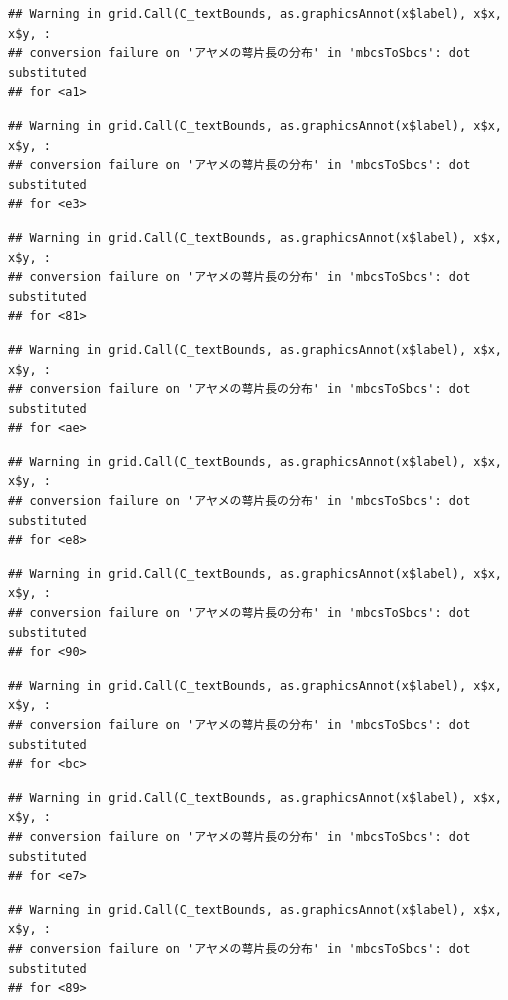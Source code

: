 \documentclass[
]{book}
\begin{document}
\begin{verbatim}
## Warning in grid.Call(C_textBounds, as.graphicsAnnot(x$label), x$x, x$y, :
## conversion failure on 'アヤメの萼片長の分布' in 'mbcsToSbcs': dot substituted
## for <a1>
\end{verbatim}

\begin{verbatim}
## Warning in grid.Call(C_textBounds, as.graphicsAnnot(x$label), x$x, x$y, :
## conversion failure on 'アヤメの萼片長の分布' in 'mbcsToSbcs': dot substituted
## for <e3>
\end{verbatim}

\begin{verbatim}
## Warning in grid.Call(C_textBounds, as.graphicsAnnot(x$label), x$x, x$y, :
## conversion failure on 'アヤメの萼片長の分布' in 'mbcsToSbcs': dot substituted
## for <81>
\end{verbatim}

\begin{verbatim}
## Warning in grid.Call(C_textBounds, as.graphicsAnnot(x$label), x$x, x$y, :
## conversion failure on 'アヤメの萼片長の分布' in 'mbcsToSbcs': dot substituted
## for <ae>
\end{verbatim}

\begin{verbatim}
## Warning in grid.Call(C_textBounds, as.graphicsAnnot(x$label), x$x, x$y, :
## conversion failure on 'アヤメの萼片長の分布' in 'mbcsToSbcs': dot substituted
## for <e8>
\end{verbatim}

\begin{verbatim}
## Warning in grid.Call(C_textBounds, as.graphicsAnnot(x$label), x$x, x$y, :
## conversion failure on 'アヤメの萼片長の分布' in 'mbcsToSbcs': dot substituted
## for <90>
\end{verbatim}

\begin{verbatim}
## Warning in grid.Call(C_textBounds, as.graphicsAnnot(x$label), x$x, x$y, :
## conversion failure on 'アヤメの萼片長の分布' in 'mbcsToSbcs': dot substituted
## for <bc>
\end{verbatim}

\begin{verbatim}
## Warning in grid.Call(C_textBounds, as.graphicsAnnot(x$label), x$x, x$y, :
## conversion failure on 'アヤメの萼片長の分布' in 'mbcsToSbcs': dot substituted
## for <e7>
\end{verbatim}

\begin{verbatim}
## Warning in grid.Call(C_textBounds, as.graphicsAnnot(x$label), x$x, x$y, :
## conversion failure on 'アヤメの萼片長の分布' in 'mbcsToSbcs': dot substituted
## for <89>
\end{verbatim}
\end{document}
